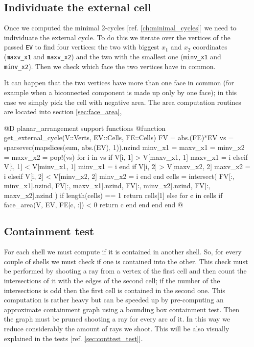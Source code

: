 \subsection{Individuate the external cell}
Once we computed the minimal 2-cycles [ref. \ref{ch:minimal_cycles}]
we need to individuate the external cycle. To do this we iterate over the
vertices of the passed \texttt{EV} to find four vertices: the two with biggest
$x_1$ and $x_2$ coordinates (\texttt{maxv\_x1} and \texttt{maxv\_x2}) and the 
two with the smallest one (\texttt{minv\_x1} and \texttt{minv\_x2}). 
Then we check which face the two vertices have in common. 

It can happen that the two vertices have more than one face in common
(for example when a biconnected component is made up only by one face);
in this case we simply pick the cell with negative area. The area
computation routines are located into section \ref{sec:face_area},


@D planar\_arrangement support functions
@{function get_external_cycle(V::Verts, EV::Cells, FE::Cells)
    FV = abs.(FE)*EV
    vs = sparsevec(mapslices(sum, abs.(EV), 1)).nzind
    minv_x1 = maxv_x1 = minv_x2 = maxv_x2 = pop!(vs)
    for i in vs
        if V[i, 1] > V[maxv_x1, 1]
            maxv_x1 = i
        elseif V[i, 1] < V[minv_x1, 1]
            minv_x1 = i
        end
        if V[i, 2] > V[maxv_x2, 2]
            maxv_x2 = i
        elseif V[i, 2] < V[minv_x2, 2]
            minv_x2 = i
        end
    end
    cells = intersect(
        FV[:, minv_x1].nzind, 
        FV[:, maxv_x1].nzind,
        FV[:, minv_x2].nzind,
        FV[:, maxv_x2].nzind
    )
    if length(cells) == 1
        return cells[1]
    else
        for c in cells
            if face_area(V, EV, FE[c, :]) < 0
                return c
            end
        end
    end
end
@}

\subsection{Containment test}

For each shell we must compute if it is contained
in another shell. So, for every couple of shells
we must check if one is contained into the other.
This check must be performed by shooting a ray from
a vertex of the first cell and then count the intersections
of it with the edges of the second cell; if the number 
of the intersections is odd then the first cell is contained
in the second one. This computation is rather heavy but can be
speeded up by pre-computing an approximate containment graph 
using a bounding box containment test. Then the graph must be
pruned shooting a ray for every arc of it. In this way we reduce
considerably the amount of rays we shoot. This will be also visually
explained in the tests [ref. \ref{sec:conttest_test}].

